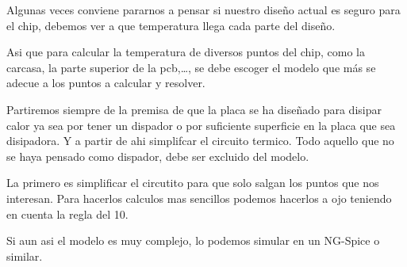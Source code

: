 Algunas veces conviene pararnos a pensar si nuestro diseño actual es seguro
para el chip, debemos ver a que temperatura llega cada parte del diseño. 

Asi que para calcular la temperatura de diversos puntos del chip, como la carcasa, la
parte superior de la pcb,\dots, se debe escoger el modelo que más se adecue a
los puntos a calcular y resolver.

Partiremos siempre de la premisa de que la placa se ha diseñado para disipar
calor ya sea por tener un dispador o por suficiente superficie en la placa
que sea disipadora. Y a partir de ahi simplifcar el circuito termico. Todo
aquello que no se haya pensado como dispador, debe ser excluido del modelo.

La primero es simplificar el circutito para que solo salgan los puntos que nos interesan. Para
hacerlos calculos mas sencillos podemos hacerlos a ojo teniendo en cuenta la regla del 10.

Si aun asi el modelo es muy complejo, lo podemos simular en un NG-Spice o similar.
